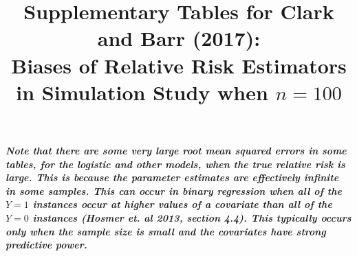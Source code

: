 \documentclass[12pt,a4paper]{article}
\date{}
\begin{document}
\title{Supplementary Tables for Clark and Barr (2017):  \\  
Biases of Relative Risk Estimators in Simulation Study when $n=100$ }


\maketitle



{\bf \it Note that there are some very large root mean squared errors in some tables, for the logistic and other models, when the true relative risk is large. This is because the parameter estimates are effectively infinite in some samples. This can occur in binary regression when all of the $Y=1$ instances occur at higher values of a covariate than all of the $Y=0$ instances (Hosmer et. al 2013, section 4.4). This typically occurs only when the sample size is small and the covariates have strong predictive power.}
\end{document}
